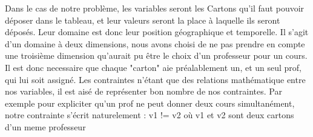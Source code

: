 \begin{center}
\end{center}

\indent

Dans le cas de notre problème, les variables seront les Cartons qu'il faut pouvoir déposer dans le tableau, et leur valeurs seront la place à laquelle ils seront déposés.
Leur domaine est donc leur position géographique et temporelle. 
Il s'agit d'un domaine à deux dimensions, nous avons choisi de ne pas prendre en compte une troisième dimension qu'aurait pu être le choix 
d'un professeur pour un cours. 
Il est donc necessaire que chaque "carton" aie préalablement un, et un seul prof, qui lui soit assigné.
Les contraintes n'étant que des relations mathématique entre nos variables, il est aisé de représenter bon nombre de nos contraintes. 
Par exemple pour expliciter qu'un prof ne peut donner deux cours simultanément, notre contrainte s'écrit naturelement :
v1 != v2 où v1 et v2 sont deux cartons d'un meme professeur
% 
% 
